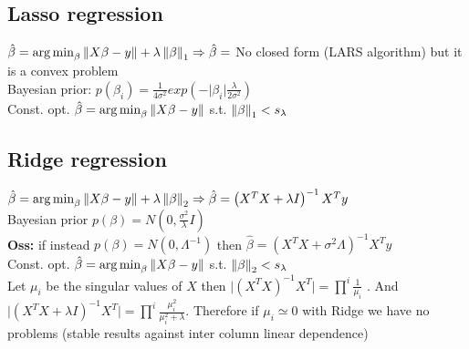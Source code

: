 \subsection*{Lasso regression}
\(\hat{\beta} = \operatorname*{arg\,min}_{\beta}{\left\lVert X\beta - y\right\rVert} + \lambda\left\lVert\beta\right\rVert_{1}\Rightarrow \hat{\beta} =\)  No closed form (LARS algorithm) but it is a convex problem\\
Bayesian prior: \(p(\beta_i) = \frac{1}{4\sigma^2}exp\left(-\vert\beta_i\vert\frac{\lambda}{2\sigma^2}\right)\)\\
{Const. opt. \scriptsize  $\hat{\beta} = \operatorname*{arg\,min}_{\beta}{\left\lVert X\beta - y\right\rVert}$ s.t. $\left\lVert\beta\right\rVert_1<s_\lambda$}
\subsection*{Ridge regression}
\(\hat{\beta} = \operatorname*{arg\,min}_{\beta}{\left\lVert X\beta - y\right\rVert} + \lambda\left\lVert\beta\right\rVert_{2}\Rightarrow \hat{\beta}  =  \left(X^TX + \lambda I\right)^{-1}X^T y\) \\
Bayesian prior \(p(\beta) = N(0, \frac{\sigma^2}{\lambda}I)\)\\ 
\textbf{Oss:} if instead \(p(\beta) = N(0, \Lambda^{-1})\) then $\hat{\beta} = \left(X^TX + \sigma^2 \Lambda\right)^{-1}X^T y$\\
{Const. opt. \scriptsize  $\hat{\beta} = \operatorname*{arg\,min}_{\beta}{\left\lVert X\beta - y\right\rVert}$ s.t. $\left\lVert\beta\right\rVert_2<s_\lambda$}\\ 
Let \(\mu_i\) be the singular values of \(X\) then \(\vert \left(X^TX \right)^{-1}X^T \vert = \prod^{i} \frac{1}{\mu_i}\) . And  \(\vert \left(X^TX + \lambda I \right)^{-1}X^T \vert =
 \prod^{i} \frac{\mu_i^2}{\mu_i^2 + \lambda}\). Therefore if \(\mu_i \simeq 0\) with Ridge we have no problems (stable results against inter column linear dependence)
